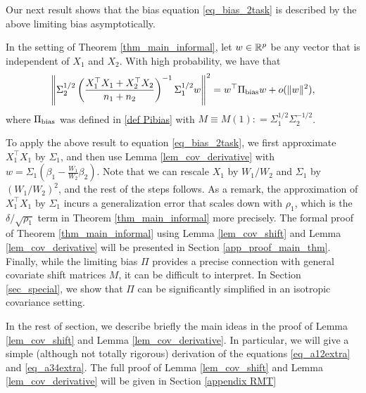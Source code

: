 Our next result shows that the bias equation \eqref{eq_bias_2task} is described by the above limiting bias asymptotically.
\begin{lemma}\label{lem_cov_derivative}
In the setting of Theorem \ref{thm_main_informal}, let $w \in \mathbb{R}^p$ be any vector that is independent of $X_1$ and $X_2$.
With high probability, we have that
\begin{equation}\label{lem_cov_derv_eq}
\begin{split}
\left\| \Sigma_2^{1/2} \left({\frac{X_1^{\top}X_1 + X_2^{\top}X_2}{n_1 + n_2}}\right)^{-1} \Sigma_1^{1/2} w \right\|^2
= w^{\top} \Pi_{\text{bias}} w + o(\|w\|^2),
\end{split}
\end{equation}
where $\Pi_{\text{bias}}$ was defined in \eqref{def Pibias} with $M\equiv M(1): = \Sigma_1^{1/2}\Sigma_2^{-1/2}$.
\end{lemma}
To apply the above result to equation \eqref{eq_bias_2task}, we first approximate $X_1^{\top}X_1$ by $\Sigma_1$, and then use Lemma \ref{lem_cov_derivative} with $w = \Sigma_1 (\beta_1 - \frac{W_1}{W_2} \beta_2)$.
Note that we can rescale $X_1$ by $W_1 / W_2$ and $\Sigma_1$ by $(W_1 / W_2)^2$, and the rest of the steps follows.
As a remark, the approximation of $X_1^{\top}X_1$ by $\Sigma_1$ incurs a generalization error that scales down with $\rho_1$, which is the $\delta / \sqrt{\rho_1}$ term in Theorem \ref{thm_main_informal} more precisely. The formal proof of Theorem \ref{thm_main_informal} using Lemma \ref{lem_cov_shift} and Lemma \ref{lem_cov_derivative} will be presented in Section \ref{app_proof_main_thm}.
Finally, while the limiting bias $\Pi$ provides a precise connection with general covariate shift matrices $M$, it can be difficult to interpret.
In Section \ref{sec_special}, we show that $\Pi$ can be significantly simplified in an isotropic covariance setting.




In the rest of section, we describe briefly the main ideas in the proof of Lemma \ref{lem_cov_shift} and Lemma \ref{lem_cov_derivative}. In particular, we will give a simple (although not totally rigorous) derivation of the equations \eqref{eq_a12extra} and \eqref{eq_a34extra}.
The full proof of Lemma \ref{lem_cov_shift} and Lemma \ref{lem_cov_derivative} will be given in Section \ref{appendix RMT}









